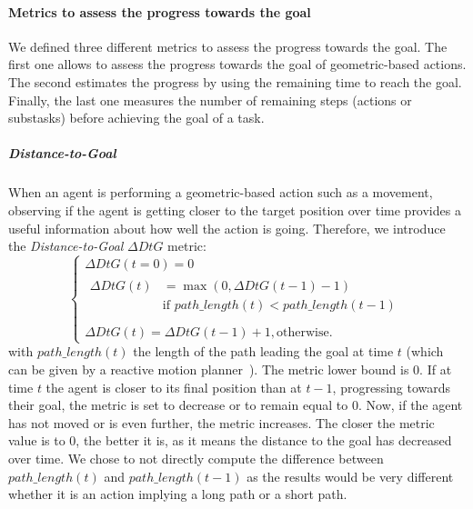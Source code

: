 \documentclass[a4paper,11pt,twoside]{StyleThese}
\begin{document}
\paragraph{Metrics to assess the progress towards the goal}

We defined three different metrics to assess the progress towards the goal. The first one allows to assess the progress towards the goal of geometric-based actions. The second estimates the progress by using the remaining time to reach the goal. Finally, the last one measures the number of remaining steps (actions or substasks) before achieving the goal of a task.

\subparagraph{Distance-to-Goal}\label{para:dtg_gd} 
When an agent is performing a geometric-based action such as a movement, observing if the agent is getting closer to the target position over time provides a useful information about how well the action is going. Therefore, we introduce the \textit{Distance-to-Goal} $\Delta DtG$ metric: 
\begin{equation}\label{eq:dtgg}
\left\{
\begin{array}{ll}
\Delta DtG(t=0) = 0\\
\begin{aligned}
\Delta DtG(t) &= \max(0,\Delta DtG(t-1) - 1)  \\&\text{if } path\_length(t) <  path\_length(t-1) \\

\end{aligned}\\
\Delta DtG(t)= \Delta DtG(t-1) + 1, \text{otherwise.}

\end{array}
\right.
\end{equation}
with $path\_length(t)$ the length of the path leading the goal at time $t$ (\eg which can be given by a reactive motion planner~\cite{khamb2019}). The metric lower bound is 0. If at time $t$ the agent is closer to its final position than at $t-1$, \ie progressing towards their goal, the metric is set to decrease or to remain equal to 0. Now, if the agent has not moved or is even further, the metric increases. The closer the metric value is to 0, the better it is, as it means the distance to the goal has decreased over time. We chose to not directly compute the difference between  $path\_length(t)$ and  $path\_length(t-1)$ as the results would be very different whether it is an action implying a long path or a short path. 
\end{document}

